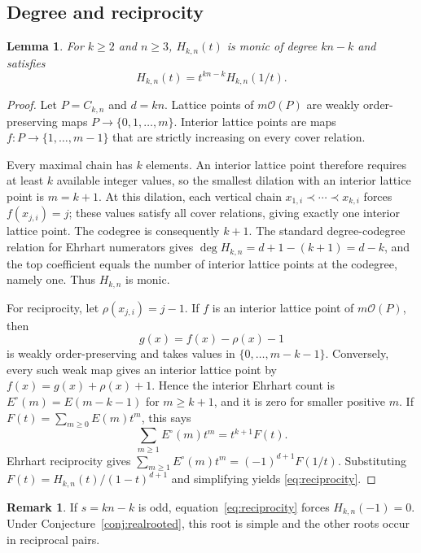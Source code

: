 \documentclass[11pt,a4paper]{article}
\newtheorem{lemma}[theorem]{Lemma}
\theoremstyle{definition}
\newtheorem{remark}[theorem]{Remark}
\begin{document}
\subsection{Degree and reciprocity}\label{sec:structure}

\begin{lemma}\label{lem:structure}
For $k\ge2$ and $n\ge3$, $H_{k,n}(t)$ is monic of degree $kn-k$ and satisfies
\begin{equation}\label{eq:reciprocity}
H_{k,n}(t)=t^{kn-k}H_{k,n}(1/t).
\end{equation}
\end{lemma}

\begin{proof}
Let $P=C_{k,n}$ and $d=kn$. Lattice points of $m\mathcal{O}(P)$ are weakly order-preserving maps $P\to\{0,1,\ldots,m\}$. Interior lattice points are maps $f:P\to\{1,\ldots,m-1\}$ that are strictly increasing on every cover relation.

Every maximal chain has $k$ elements. An interior lattice point therefore requires at least $k$ available integer values, so the smallest dilation with an interior lattice point is $m=k+1$. At this dilation, each vertical chain $x_{1,i}\prec\cdots\prec x_{k,i}$ forces $f(x_{j,i})=j$; these values satisfy all cover relations, giving exactly one interior lattice point. The codegree is consequently $k+1$. The standard degree-codegree relation for Ehrhart numerators gives $\deg H_{k,n}=d+1-(k+1)=d-k$, and the top coefficient equals the number of interior lattice points at the codegree, namely one. Thus $H_{k,n}$ is monic.

For reciprocity, let $\rho(x_{j,i})=j-1$. If $f$ is an interior lattice point of $m\mathcal{O}(P)$, then
\[
g(x)=f(x)-\rho(x)-1
\]
is weakly order-preserving and takes values in $\{0,\ldots,m-k-1\}$. Conversely, every such weak map gives an interior lattice point by $f(x)=g(x)+\rho(x)+1$. Hence the interior Ehrhart count is $E^\circ(m)=E(m-k-1)$ for $m\ge k+1$, and it is zero for smaller positive $m$. If $F(t)=\sum_{m\ge0}E(m)t^m$, this says
\[
\sum_{m\ge1}E^\circ(m)t^m=t^{k+1}F(t).
\]
Ehrhart reciprocity gives $\sum_{m\ge1}E^\circ(m)t^m=(-1)^{d+1}F(1/t)$. Substituting $F(t)=H_{k,n}(t)/(1-t)^{d+1}$ and simplifying yields \eqref{eq:reciprocity}.
\end{proof}

\begin{remark}\label{rem:minusone}
If $s=kn-k$ is odd, equation~\eqref{eq:reciprocity} forces $H_{k,n}(-1)=0$. Under Conjecture~\ref{conj:realrooted}, this root is simple and the other roots occur in reciprocal pairs.
\end{remark}
\end{document}
